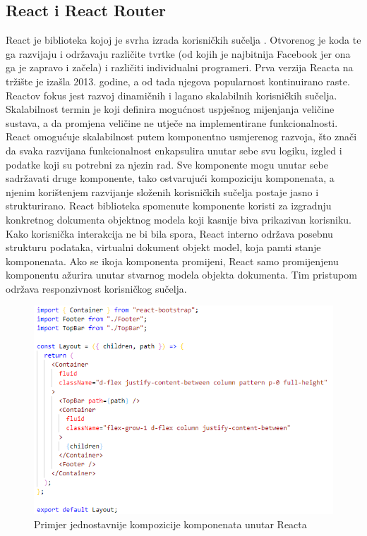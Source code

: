 \documentclass[times, utf8, zavrsni, numeric]{fer}
\begin{document}
			\subsection{React i React Router}
			React\cite{react2021} je biblioteka kojoj je svrha izrada korisničkih sučelja . Otvorenog je koda te ga razvijaju i održavaju različite tvrtke (od kojih je najbitnija Facebook jer ona ga je zapravo i začela) i različiti individualni programeri. Prva verzija Reacta na tržište je izašla 2013. godine, a od tada njegova popularnost kontinuirano raste. Reactov fokus jest razvoj dinamičnih i lagano skalabilnih korisničkih sučelja. Skalabilnost  termin je koji definira mogućnost uspješnog mijenjanja veličine sustava, a da promjena veličine ne utječe na implementirane funkcionalnosti. React omogućuje skalabilnost  putem komponentno usmjerenog razvoja, što znači da svaka razvijana funkcionalnost enkapsulira unutar sebe svu logiku, izgled i podatke koji su potrebni za njezin rad. Sve komponente mogu unutar sebe sadržavati druge komponente, tako ostvarujući kompoziciju  komponenata, a njenim korištenjem razvijanje složenih korisničkih sučelja postaje jasno i strukturirano. React biblioteka spomenute komponente koristi za izgradnju konkretnog dokumenta objektnog modela koji kasnije biva prikazivan korisniku. Kako korisnička interakcija ne bi bila spora, React interno održava posebnu strukturu podataka, virtualni dokument objekt model, koja pamti stanje komponenata. Ako se ikoja komponenta promijeni, React samo promijenjenu komponentu ažurira unutar stvarnog modela objekta dokumenta. Tim pristupom održava responzivnost korisničkog sučelja.\\
			\begin{figure}[H]
				\centering
				\includegraphics[scale=0.75]{pictures/prikazi/React.png}
				\caption{Primjer jednostavnije kompozicije komponenata unutar Reacta}
				\label{fig:react}
			\end{figure}
\end{document}
